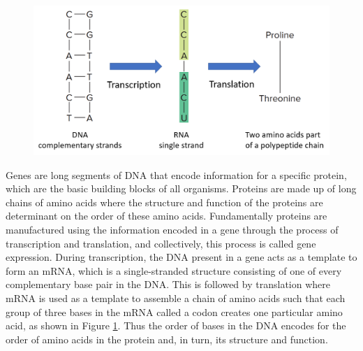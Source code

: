 \begin{figure}
  \centering
  \includegraphics[width=.75\linewidth]{images/ch_2_protein_generation.PNG}
  \label{fig:ch_2_protein_generation}
\end{figure}


Genes are long segments of DNA that encode information for a specific protein, which are the basic building blocks of all organisms. Proteins are made up of long chains of amino acids where the structure and function of the proteins are determinant on the order of these amino acids. Fundamentally proteins are manufactured using the information encoded in a gene through the process of transcription and translation, and collectively, this process is called gene expression. During transcription, the DNA present in a gene acts as a template to form an mRNA, which is a single-stranded structure consisting of one of every complementary base pair in the DNA. This is followed by translation where mRNA is used as a template to assemble a chain of amino acids such that each group of three bases in the mRNA called a codon creates one particular amino acid, as shown in Figure \ref{fig:ch_2_protein_generation}. Thus the order of bases in the DNA encodes for the order of amino acids in the protein and, in turn, its structure and function\cite{clancy2008translation}.


